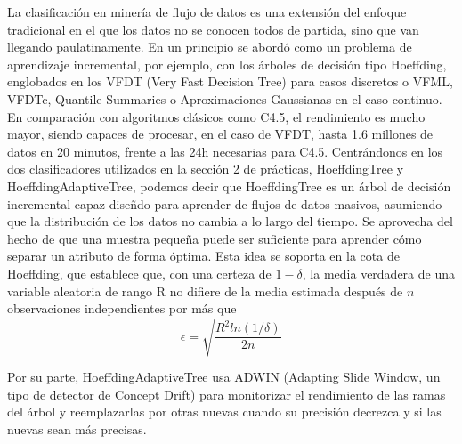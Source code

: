 La clasificación en minería de flujo de datos es una extensión del enfoque tradicional en el que los datos no se conocen todos de partida, sino que van llegando paulatinamente. En un principio se abordó como un problema de aprendizaje incremental, por ejemplo, con los árboles de decisión tipo Hoeffding, englobados en los VFDT (Very Fast Decision Tree) para casos discretos o VFML, VFDTc, Quantile Summaries o Aproximaciones Gaussianas en el caso continuo. En comparación con algoritmos clásicos como C4.5, el rendimiento es mucho mayor, siendo capaces de procesar, en el caso de VFDT, hasta 1.6 millones de datos en 20 minutos, frente a las 24h necesarias para C4.5. Centrándonos en los dos clasificadores utilizados en la sección 2 de prácticas, HoeffdingTree y HoeffdingAdaptiveTree, podemos decir que HoeffdingTree es un árbol de decisión incremental capaz diseñdo para aprender de flujos de datos masivos, asumiendo que la distribución de los datos no cambia a lo largo del tiempo. Se aprovecha del hecho de que una muestra pequeña puede ser suficiente para aprender cómo separar un atributo de forma óptima. Esta idea se soporta en la cota de Hoeffding, que establece que, con una certeza de $1-\delta$, la media verdadera de una variable aleatoria de rango R no difiere de la media estimada después de $n$ observaciones independientes por más que
$$\epsilon = \sqrt{\frac{R^2 ln(1/\delta)}{2n}}$$

Por su parte, HoeffdingAdaptiveTree usa ADWIN (Adapting Slide Window, un tipo de detector de Concept Drift) para monitorizar el rendimiento de las ramas del árbol y reemplazarlas por otras nuevas cuando su precisión decrezca y si las nuevas  sean más precisas. \\

